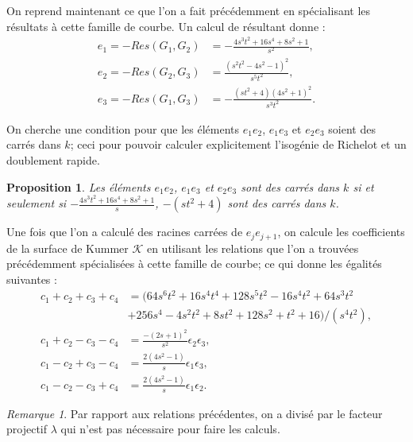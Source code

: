 \documentclass[a4paper,12pt]{article}
\newtheorem{proposition}[theoreme]{Proposition}
\theoremstyle{definition}
\theoremstyle{remark}
\newtheorem{remarque}{Remarque}
\numberwithin{equation}{section}
\begin{document}
On reprend maintenant ce que l'on a fait précédemment en spécialisant les résultats à cette famille de courbe. Un calcul de résultant donne :
\begin{align*}
e_1 = -Res(G_1,G_2) &= -\frac{4s^3t^2 + 16s^4 + 8s^2 + 1}{s^2}, \\
e_2 = -Res(G_2,G_3) &= \frac{(s^2t^2 - 4s^2 - 1)^2}{s^5t^2}, \\
e_3 = -Res(G_1,G_3) &= -\frac{(st^2 + 4)(4s^2 + 1)^2}{s^3t^2}.
\end{align*}

On cherche une condition pour que les éléments $e_1e_2$, $e_1e_3$ et $e_2e_3$ soient des carrés dans $k$; ceci pour pouvoir calculer explicitement l'isogénie de Richelot et un doublement rapide.

\begin{proposition}
Les éléments $e_1e_2$, $e_1e_3$ et $e_2e_3$ sont des carrés dans $k$ si et seulement si
$-\frac{4s^3t^2 + 16s^4 + 8s^2 + 1}{s}$, $-(st^2+4)$ sont des carrés dans $k$.
\end{proposition}

Une fois que l'on a calculé des racines carrées de $e_je_{j+1}$, on calcule les coefficients de la surface de Kummer $\mathcal{K}$ en utilisant les relations que l'on a trouvées précédemment spécialisées à cette famille de courbe; ce qui donne les égalités suivantes :
\begin{align*}
c_1+c_2+c_3+c_4 &= (64s^6t^2 + 16s^4t^4 + 128s^5t^2 - 16s^4t^2 + 64s^3t^2 \\
    & + 256s^4 - 4s^2t^2 + 8st^2 + 128s^2 + t^2 + 16)/(s^4t^2), \\
c_1+c_2-c_3-c_4 &= \frac{-(2s + 1)^2}{s^2}\epsilon_2\epsilon_3, \\
c_1-c_2+c_3-c_4 &= \frac{2(4s^2 - 1)}{s}\epsilon_1\epsilon_3, \\
c_1-c_2-c_3+c_4 &= \frac{2(4s^2 - 1)}{s}\epsilon_1\epsilon_2.
\end{align*}

\begin{remarque}
Par rapport aux relations précédentes, on a divisé par le facteur projectif $\lambda$ qui n'est pas nécessaire pour faire les calculs.
\end{remarque}

\end{document}
